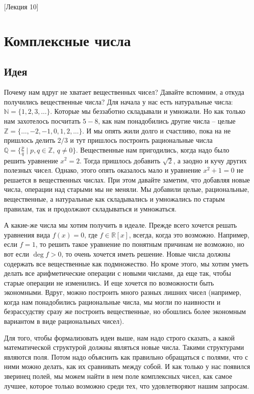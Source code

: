 [Лекция 10]


\newpage
\section{Комплексные числа}

\subsection{Идея}

Почему нам вдруг не хватает вещественных чисел?
Давайте вспомним, а откуда получились вещественные числа?
Для начала у нас есть натуральные числа: $\mathbb N = \{1,2,3,\ldots\}$.
Которые мы беззаботно складывали и умножали.
Но как только нам захотелось посчитать $5 - 8$, как нам понадобились другие числа -- целые $\mathbb Z = \{\ldots, -2, -1,0,1,2,\ldots\}$.
И мы опять жили долго и счастливо, пока на не пришлось делить $2/3$ и тут пришлось построить рациональные числа $\mathbb Q = \{\frac{p}{q}\mid p,q\in \mathbb Z,\, q\neq 0\}$.
Вещественные нам пригодились, когда надо было решить уравнение $x^2 = 2$.
Тогда пришлось добавить $\sqrt{2}$, а заодно и кучу других полезных чисел.
Однако, этого опять оказалось мало и уравнение $x^2 +1 = 0$ не решается в вещественных числах.
При этом давайте заметим, что добавляя новые числа, операции над старыми мы не меняли.
Мы добавили целые, рациональные, вещественные, а натуральные как складывались и умножались по старым правилам, так и продолжают складываться и умножаться.

А какие-же числа мы хотим получить в идеале.
Прежде всего хочется решать уравнения вида $f(x) = 0$, где $f\in \mathbb R[x]$, всегда, когда это возможно.
Например, если $f = 1$, то решить такое уравнение по понятным причинам не возможно, но вот если $\deg f > 0$, то очень хочется иметь решение.
Новые числа должны содержать все вещественные как подмножество.
Но кроме этого, мы хотим уметь делать все арифметические операции с новыми числами, да еще так, чтобы старые операции не изменились.
И еще хочется по возможности быть экономными.
Вдруг, можно построить много разных лишних чисел (например, когда нам понадобились рациональные числа, мы могли по наивности и безрассудству сразу же построить вещественные, но обошлись более экономным вариантом в виде рациональных чисел).

Для того, чтобы формализовать идеи выше, нам надо строго сказать, а какой математической структурой должны являться новые числа.
Такими структурами являются поля.
Потом надо объяснить как правильно обращаться с полями, что с ними можно делать, как их сравнивать между собой.
И как только у нас появился зверинец полей, мы можем найти в нем поле комплексных чисел, как самое лучшее, которое только возможно среди тех, что удовлетворяют нашим запросам.


